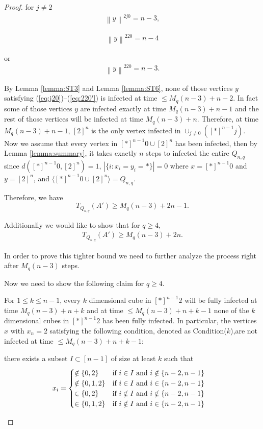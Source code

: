 \documentclass[10pt,a4paper]{amsart}
\renewcommand{\geq}{\geqslant}
\renewcommand{\leq}{\leqslant}
\begin{document}
\begin{proof}
for $j \neq 2$
\begin{align}\label{eq:2j0}
    \left \lVert y \right \rVert^{2j0}= n-3,
\end{align}

 \begin{align} \label{eq:220}
\left \lVert y \right \rVert^{220}= n-4 
 \end{align}

or 
\begin{align} \label{eq:220'}
    \left \lVert y \right \rVert^{220}=n-3.
\end{align}
 

By Lemma \ref{lemma:ST3} and Lemma \ref{lemma:ST6}, none of those vertices $y$ satisfying (\ref{eq:j20})--(\ref{eq:220'}) is infected at time $ \leq M_q(n-3)+n-2$. In fact some of those vertices $y$ are infected exactly at time $M_q(n-3)+n-1$ and the rest of those vertices will be infected at time $M_q(n-3)+n$. Therefore, at time $M_q(n-3)+n-1$, $[2]^n$ is the only vertex infected in $\cup_{j \neq 0} ([\ast]^{n-1}j)$. Now we assume that every vertex in $[\ast]^{n-1}0 \cup [2]^n$ has been infected, then by Lemma \ref{lemma:summary}, it takes exactly $n$ steps to infected the entire $Q_{n,q}$ since $d([\ast]^{n-1}0,[2]^n)=1$, $|\{i:x_i =y_i=\ast\}|=0$ where $x=[\ast]^{n-1}0$ and $y=[2]^n$, and $\langle[\ast]^{n-1}0 \cup [2]^n \rangle=Q_{n,q}$.

Therefore, we have 
$$T_{Q_{n,q}}(A') \geq M_q(n-3)+2n-1.$$

Additionally we would like to show that for $q \geq 4$,
\begin{align}\label{eq:T(Qn)}
    T_{Q_{n,q}}(A') \geq M_q(n-3)+2n.
\end{align} 

In order to prove this tighter bound we need to further analyze the process right after $M_q(n-3)$ steps.

Now we need to show the following claim for $q \geq 4$. 
\begin{claim} \label{claim:subset I}
    For $ 1 \leq k \leq n-1$, every $k$ dimensional cube in $[\ast]^{n-1}2$ will be fully infected at time $M_q(n-3)+n+k$ and at time $\leq M_q(n-3)+n+k-1$ none of the $k$ dimensional cubes in $[\ast]^{n-1}2$ has been fully infected. In particular, the vertices $x$ with $x_n=2$ satisfying the following condition, denoted as Condition($k$),are not infected at time  $\leq M_q(n-3)+n+k-1$:
    
     there exists a subset $I \subset [n-1]$ of size at least $k$ such that 
\begin{align*}
x_i &=\begin{cases} 
  \notin \{0,2\}& \text{if $i \in I$ and $i \notin \{n-2,n-1\}$} \\
   \notin \{0,1,2\} & \text{if $i \in I$ and $ i \in \{n-2,n-1\}$} \\
   \in \{0,2\}& \text{if $i \notin I$ and $i \notin \{n-2,n-1\}$}\\
   \in \{0,1,2\} & \text{if $i \notin I$ and $i \in \{n-2,n-1\}$}
   \end{cases}
\end{align*}




\end{claim}
\end{proof}
\end{document}
